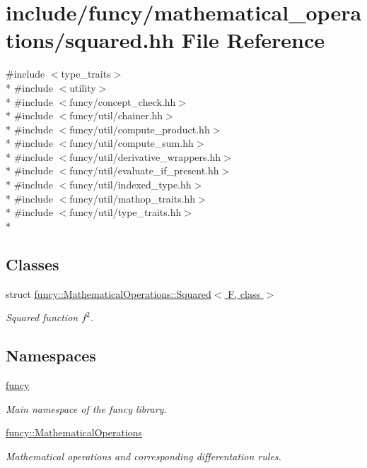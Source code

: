 \hypertarget{squared_8hh}{\section{include/funcy/mathematical\-\_\-operations/squared.hh File Reference}
\label{squared_8hh}
}
{\ttfamily \#include $<$type\-\_\-traits$>$}\\*
{\ttfamily \#include $<$utility$>$}\\*
{\ttfamily \#include $<$funcy/concept\-\_\-check.\-hh$>$}\\*
{\ttfamily \#include $<$funcy/util/chainer.\-hh$>$}\\*
{\ttfamily \#include $<$funcy/util/compute\-\_\-product.\-hh$>$}\\*
{\ttfamily \#include $<$funcy/util/compute\-\_\-sum.\-hh$>$}\\*
{\ttfamily \#include $<$funcy/util/derivative\-\_\-wrappers.\-hh$>$}\\*
{\ttfamily \#include $<$funcy/util/evaluate\-\_\-if\-\_\-present.\-hh$>$}\\*
{\ttfamily \#include $<$funcy/util/indexed\-\_\-type.\-hh$>$}\\*
{\ttfamily \#include $<$funcy/util/mathop\-\_\-traits.\-hh$>$}\\*
{\ttfamily \#include $<$funcy/util/type\-\_\-traits.\-hh$>$}\\*
\subsection*{Classes}
\begin{DoxyCompactItemize}
\item 
struct \hyperlink{structfuncy_1_1MathematicalOperations_1_1Squared}{funcy\-::\-Mathematical\-Operations\-::\-Squared$<$ F, class $>$}
\begin{DoxyCompactList}\small\item\em Squared function $f^2$. \end{DoxyCompactList}\end{DoxyCompactItemize}
\subsection*{Namespaces}
\begin{DoxyCompactItemize}
\item 
\hyperlink{namespacefuncy}{funcy}
\begin{DoxyCompactList}\small\item\em Main namespace of the funcy library. \end{DoxyCompactList}\item 
\hyperlink{namespacefuncy_1_1MathematicalOperations}{funcy\-::\-Mathematical\-Operations}
\begin{DoxyCompactList}\small\item\em Mathematical operations and corresponding differentation rules. \end{DoxyCompactList}\end{DoxyCompactItemize}
